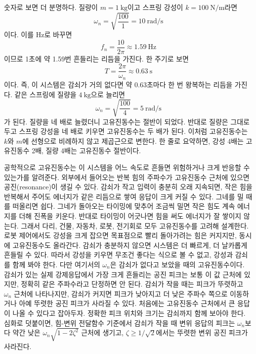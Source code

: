 숫자로 보면 더 분명하다.
질량이 $m=1~\mathrm{kg}$이고 스프링 강성이 $k=100~\mathrm{N/m}$라면
\begin{equation}
  \omega_n=\sqrt{\frac{100}{1}}=10~\mathrm{rad/s}
\end{equation}
이다.
이를 Hz로 바꾸면
\begin{equation}
  f_n=\frac{10}{2\pi}\approx 1.59~\mathrm{Hz}
\end{equation}
이므로 1초에 약 1.59번 흔들리는 리듬을 가진다.
한 주기로 보면
\begin{equation}
  T=\frac{2\pi}{\omega_n}\approx0.63~\mathrm{s}
\end{equation}
이다.
즉, 이 시스템은 감쇠가 거의 없다면 약 0.63초마다 한 번 왕복하는 리듬을 가진다.
같은 스프링에 질량을 $4~\mathrm{kg}$으로 늘리면
\begin{equation}
  \omega_n=\sqrt{\frac{100}{4}}=5~\mathrm{rad/s}
\end{equation}
가 된다.
질량을 네 배로 늘렸더니 고유진동수는 절반이 되었다.
반대로 질량은 그대로 두고 스프링 강성을 네 배로 키우면 고유진동수는 두 배가 된다.
이처럼 고유진동수는 $k$와 $m$에 선형으로 비례하지 않고 제곱근으로 변한다.
한 줄로 요약하면, 강성 4배는 고유진동수 2배, 질량 4배는 고유진동수 절반이다.

공학적으로 고유진동수는 이 시스템을 어느 속도로 흔들면 위험하거나 크게 반응할 수 있는가를 알려준다.
외부에서 들어오는 반복 힘의 주파수가 고유진동수 근처에 있으면 공진(resonance)이 생길 수 있다.
감쇠가 작고 입력이 충분히 오래 지속되면, 작은 힘을 반복해서 주어도 에너지가 같은 리듬으로 쌓여 응답이 크게 커질 수 있다.
그네를 밀 때를 떠올리면 쉽다.
그네가 돌아오는 타이밍에 맞추어 조금씩 밀면 작은 힘도 계속 에너지를 더해 진폭을 키운다.
반대로 타이밍이 어긋나면 힘을 써도 에너지가 잘 쌓이지 않는다.
그래서 다리, 건물, 자동차, 로봇, 전기회로 모두 고유진동수를 고려해 설계한다.
로봇 제어에서도 강성을 크게 잡으면 목표점으로 빨리 돌아가려는 힘은 커지지만, 동시에 고유진동수도 올라간다.
감쇠가 충분하지 않으면 시스템은 더 빠르게, 더 날카롭게 흔들릴 수 있다.
따라서 강성을 키우면 무조건 좋다는 식으로 볼 수 없고, 강성과 감쇠를 함께 봐야 한다.
다만 여기서의 $\omega_n$은 감쇠가 없다고 보았을 때의 고유진동수이다.
감쇠가 있는 실제 강제응답에서 가장 크게 흔들리는 공진 피크는 보통 이 값 근처에 있지만, 정확히 같은 주파수라고 단정하면 안 된다.
감쇠가 작을 때는 피크가 뚜렷하고 $\omega_n$ 근처에 나타나지만, 감쇠가 커지면 피크가 낮아지고 더 낮은 주파수 쪽으로 이동하거나 아예 뚜렷한 공진 피크가 사라질 수 있다.
처음에는 고유진동수 근처에서 큰 응답이 나올 수 있다고 잡아두자.
정확한 피크 위치와 크기는 감쇠까지 함께 보아야 한다.
심화로 덧붙이면, 힘-변위 전달함수 기준에서 감쇠가 작을 때 변위 응답의 피크는 $\omega_n$보다 약간 낮은 $\omega_n\sqrt{1-2\zeta^2}$ 근처에 생기고, $\zeta\ge1/\sqrt{2}$에서는 뚜렷한 변위 공진 피크가 사라진다.

